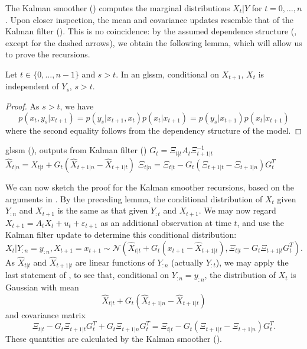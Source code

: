 The Kalman smoother () computes the marginal distributions $X_{t} | Y$ for $t = 0, \dots, n$. Upon closer inspection, the mean and covariance updates resemble that of the Kalman filter (). This is no coincidence: by the assumed dependence structure (, except for the dashed arrows), we obtain the following lemma, which will allow us to prove the recursions.
\begin{lemma}
    Let $t \in \{0, \dots, n - 1\}$ and $s > t$. In an \gls{glssm}, conditional on $X_{t + 1}$, $X_{t}$ is independent of $Y_{s}$, $s > t$. 
\end{lemma}
\begin{proof}
    As $s > t$, we have
    $$
    p(x_{t}, y_{s} | x_{t + 1}) = p(y_{s}| x_{t + 1}, x_{t}) p(x_{t} | x_{t + 1}) = p(y_{s} | x_{t + 1}) p(x_{t} | x_{t + 1})
    $$
    where the second equality follows from the dependency structure of the model. 
\end{proof}
\begin{algorithm}
    \caption{Kalman smoother. Note that the Kalman filter already outputs the smoothed last state $\hat X_{n|n}$ and covariance $\Xi_{n|n}$.}
    \label{alg:kalman_smoother}
    \begin{algorithmic}[1]
        \Require \gls{glssm} (), outputs from Kalman filter ()
            \State $G_{t} = \Xi_{t|t} A_{t}\Xi_{t+1|t}^{-1}$
            \State $\hat X_{t | n} = \hat X_{t|t} + G_{t} \left( \hat X_{t + 1|n} - \hat X_{t + 1|t} \right)$
            \State $\Xi_{t|n} = \Xi_{t|t} - G_{t} \left( \Xi_{t + 1|t} - \Xi_{t + 1|n} \right)G_{t}^T$
        \EndFor
    \end{algorithmic}
\end{algorithm}


We can now sketch the proof for the Kalman smoother recursions, based on the arguments in \citep[Chapter 7.3]{Chopin2020Introduction}. By the preceding lemma, the conditional distribution of $X_{t}$ given $Y_{:n}$ and $X_{t + 1}$ is the same as that given $Y_{:t}$ and $X_{t + 1}$. 
We may now regard $X_{t + 1} = A_{t}X_{t} + u_{t} + \varepsilon_{t + 1}$ as an additional observation at time $t$, and use the Kalman filter update to determine this conditional distribution:
$$
X_{t} | Y_{:n} = y_{:n}, X_{t + 1} = x_{t+1}\sim \mathcal N \left(\hat X_{t|t} + G_{t}(x_{t + 1} - \hat X_{t + 1 | t}), \Xi_{t |t} - G_{t} \Xi_{t + 1 | t} G_{t}^{T} \right).
$$
As $\hat X_{t|t}$ and $\hat X_{t+1|t}$ are linear functions of $Y_{:n}$ (actually $Y_{:t}$), we may apply the last statement of , to see that, conditional on $Y_{:n} = y_{:n}$, the distribution of $X_{t}$ is Gaussian with mean
$$
\hat X_{t|t} + G_{t} \left( \hat X_{t + 1 | n} - \hat X_{t + 1 | t} \right)
$$
and covariance matrix 
$$
\Xi_{t | t} - G_{t} \Xi_{t + 1|t} G_{t}^{T} + G_{t} \Xi_{t + 1 | n} G_{t}^{T} = \Xi_{t|t} - G_{t} \left( \Xi_{t + 1 | t} - \Xi_{t + 1 | n} \right)G_{t} ^{T}.
$$
These quantities are calculated by the Kalman smoother ().

